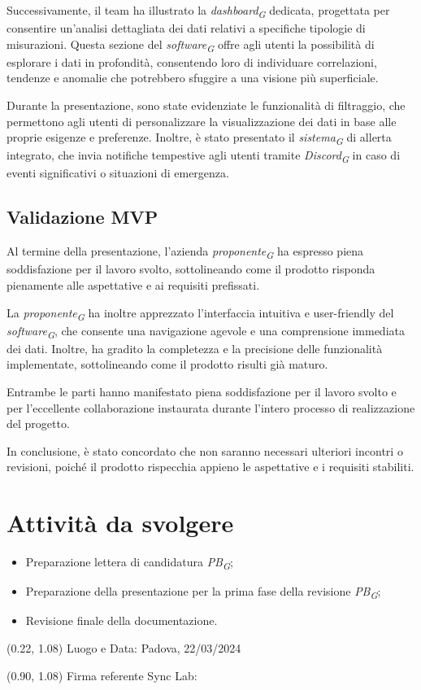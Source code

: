 \documentclass{article}
\begin{document}
    Successivamente, il team ha illustrato la \textit{dashboard}\textsubscript{\textit{G}} dedicata, progettata per consentire un'analisi dettagliata dei dati relativi a specifiche tipologie di misurazioni. Questa sezione del \textit{software}\textsubscript{\textit{G}} offre agli utenti la possibilità di esplorare i dati in profondità, consentendo loro di individuare correlazioni, tendenze e anomalie che potrebbero sfuggire a una visione più superficiale.

    Durante la presentazione, sono state evidenziate le funzionalità di filtraggio, che permettono agli utenti di personalizzare la visualizzazione dei dati in base alle proprie esigenze e preferenze. Inoltre, è stato presentato il \textit{sistema}\textsubscript{\textit{G}} di allerta integrato, che invia notifiche tempestive agli utenti tramite \textit{Discord}\textsubscript{\textit{G}} in caso di eventi significativi o situazioni di emergenza.

    \subsection{Validazione MVP}
    Al termine della presentazione, l'azienda \textit{proponente}\textsubscript{\textit{G}} ha espresso piena soddisfazione per il lavoro svolto, sottolineando come il prodotto risponda pienamente alle aspettative e ai requisiti prefissati.
    
    La \textit{proponente}\textsubscript{\textit{G}} ha inoltre apprezzato l'interfaccia intuitiva e user-friendly del \textit{software}\textsubscript{\textit{G}}, che consente una navigazione agevole e una comprensione immediata dei dati. Inoltre, ha gradito la completezza e la precisione delle funzionalità implementate, sottolineando come il prodotto risulti già maturo.

    Entrambe le parti hanno manifestato piena soddisfazione per il lavoro svolto e per l'eccellente collaborazione instaurata durante l'intero processo di realizzazione del progetto.

    In conclusione, è stato concordato che non saranno necessari ulteriori incontri o revisioni, poiché il prodotto rispecchia appieno le aspettative e i requisiti stabiliti.

\section{Attività da svolgere}
    \begin{itemize}
        \item Preparazione lettera di candidatura \textit{PB}\textsubscript{\textit{G}};
        \item Preparazione della presentazione per la prima fase della revisione \textit{PB}\textsubscript{\textit{G}};
        \item Revisione finale della documentazione.
\end{itemize}
\begin{textblock*}{\textwidth}(0.22\textwidth, 1.08\textheight)
    Luogo e Data: Padova, 22/03/2024
\end{textblock*}

\begin{textblock*}{\textwidth}(0.90\textwidth, 1.08\textheight)
        Firma referente Sync Lab:
\end{textblock*}
\end{document}
